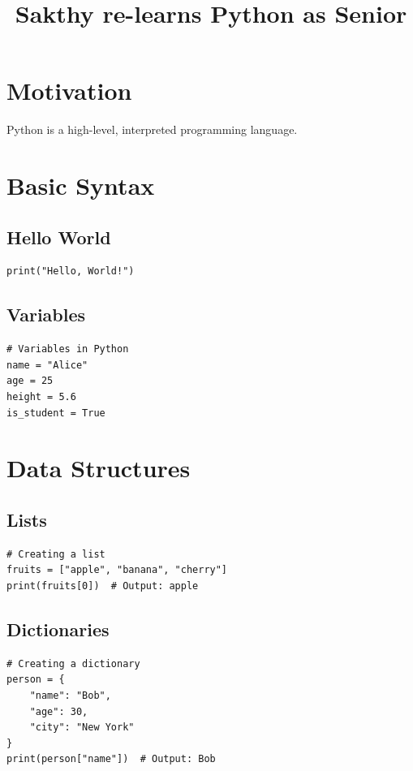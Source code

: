 \documentclass[11pt]{article}
\title{Sakthy re-learns Python as Senior}
\begin{document}
\maketitle
\tableofcontents
\newpage

\section{Motivation}
Python is a high-level, interpreted programming language.

\section{Basic Syntax}

\subsection{Hello World}
\begin{lstlisting}
print("Hello, World!")
\end{lstlisting}

\subsection{Variables}
\begin{lstlisting}
# Variables in Python
name = "Alice"
age = 25
height = 5.6
is_student = True
\end{lstlisting}

\section{Data Structures}

\subsection{Lists}
\begin{lstlisting}
# Creating a list
fruits = ["apple", "banana", "cherry"]
print(fruits[0])  # Output: apple
\end{lstlisting}

\subsection{Dictionaries}
\begin{lstlisting}
# Creating a dictionary
person = {
    "name": "Bob",
    "age": 30,
    "city": "New York"
}
print(person["name"])  # Output: Bob
\end{lstlisting}
\end{document}
